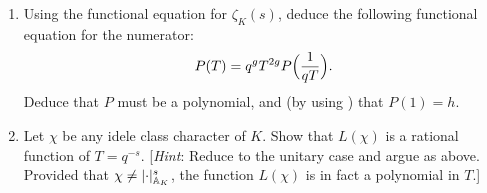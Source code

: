 \begin{exercise}[22]
\begin{enumerate}[label=(\alph*)]
      the form given in the theorem above, with $P(q^{-s})$ an entire
      function.
    \item Using the functional equation for $\zeta_K(s)$, deduce the
      following functional equation for the numerator:
      \[
        P(T) = q^g T^{2g} P\Bigl(\frac{1}{qT}\Bigr).
      \]
      Deduce that $P$ must be a polynomial, and (by using
      ) that $P(1) = h$.
    \item Let $\chi$ be any idele class character of $K$. Show that $L(\chi)$
      is a rational function of $T = q^{-s}$. [\emph{Hint}: Reduce to the
      unitary case and argue as above. Provided that
      $\chi \neq \lvert\cdot\rvert_{\mathbb{A}_K}^s$, the function $L(\chi)$ is in fact a
      polynomial in $T$.]
  \end{enumerate}
\end{exercise}

